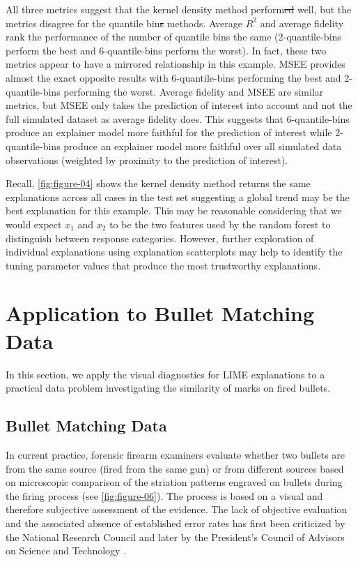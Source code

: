 \documentclass[AMS,STIX2COL]{WileyNJD-v2}\usepackage[]{graphicx}\usepackage[]{color}
\begin{document}
All three metrics suggest that the kernel density method perform\sout{ed} well, but the metrics disagree for the quantile bin\sout{s} methods. Average $R^2$ and average fidelity rank the performance of the number of quantile bins the same (2-quantile-bins perform the best and 6-quantile-bins perform the worst). In fact, these two metrics appear to have a mirrored relationship in this example. MSEE provides almost the exact opposite results with 6-quantile-bins performing the best and 2-quantile-bins performing the worst. Average fidelity and MSEE are similar metrics, but MSEE only takes the prediction of interest into account and not the full simulated dataset as average fidelity does. This suggests that 6-quantile-bins produce an explainer model more faithful for the prediction of interest while 2-quantile-bins produce an explainer model more faithful over all simulated data observations (weighted by proximity to the prediction of interest). 

Recall, \autoref{fig:figure-04} shows the kernel density method returns the same explanations across all cases in the test set suggesting a global trend may be the best explanation for this example. This may be reasonable considering that we would expect $x_1$ and $x_2$ to be  the two features used by the random forest to distinguish between response categories. However, further exploration of individual explanations using explanation scatterplots may help to identify the tuning parameter values that produce the most trustworthy explanations.

\section{Application to Bullet Matching Data} \label{application}

In this section, we apply the visual diagnostics for LIME explanations to a practical data problem investigating the similarity of marks on fired bullets.

\subsection{Bullet Matching Data}







In current practice, forensic firearm examiners evaluate whether two bullets are from the same source (fired from the same gun) or from different sources based on microscopic comparison of the striation patterns engraved on bullets during the firing process (see \autoref{fig:figure-06}). The process is based on a visual and therefore subjective assessment of the evidence. The lack of objective evaluation and the associated absence of established error rates has first been criticized by the National Research Council \cite{nrc:2009} and later by the President's Council of Advisors on Science and Technology \cite{pcast:2016}.
\end{document}
